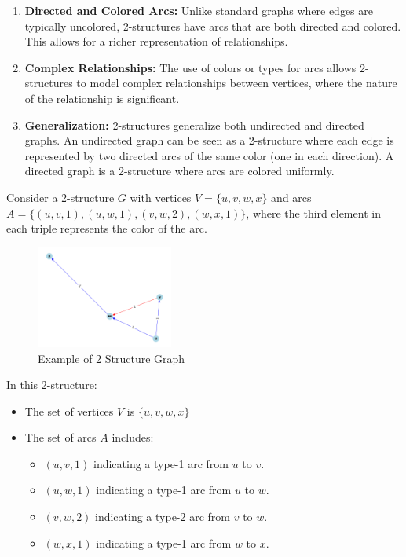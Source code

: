 \begin{enumerate}
    \item \textbf{Directed and Colored Arcs:} Unlike standard graphs where edges are typically uncolored, 2-structures have arcs that are both directed and colored.
    This allows for a richer representation of relationships.
    \item \textbf{Complex Relationships:} The use of colors or types for arcs allows 2-structures to model complex relationships between vertices, where the nature of the relationship is significant.
    \item \textbf{Generalization:} 2-structures generalize both undirected and directed graphs.
    An undirected graph can be seen as a 2-structure where each edge is represented by two directed arcs of the same color (one in each direction).
    A directed graph is a 2-structure where arcs are colored uniformly.
\end{enumerate}

\begin{myex}[2-Structure]
    Consider a 2-structure $G$ with vertices $V = \{u, v, w, x\}$ and arcs $A = \{(u, v, 1), (u, w, 1), (v, w, 2), (w, x, 1)\}$, where the third element in each triple represents the color of the arc.

    \begin{figure}[!h]
        \centering
        \includegraphics[width=0.40\textwidth]{images/graphs/2_structure_graph_example}
        \caption{Example of 2 Structure Graph}
        \label{fig:2-structure-graph-example-simple}
    \end{figure}

    In this 2-structure:
    \begin{itemize}
        \item The set of vertices $V$ is $\{u, v, w, x\}$
        \item The set of arcs $A$ includes:
        \begin{itemize}
            \item $(u, v, 1)$ indicating a type-1 arc from $u$ to $v$.
            \item $(u, w, 1)$ indicating a type-1 arc from $u$ to $w$.
            \item $(v, w, 2)$ indicating a type-2 arc from $v$ to $w$.
            \item $(w, x, 1)$ indicating a type-1 arc from $w$ to $x$.
        \end{itemize}
    \end{itemize}
\end{myex}

